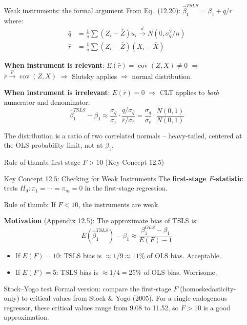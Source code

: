 \documentclass[10pt]{beamer}
\begin{document}
\begin{frame}{Weak instruments: the formal argument}
\label{slide:weak_formal}
From Eq.\ (12.20): $\widehat{\beta}_1^{TSLS} = \beta_1 + \bar{q}/\bar{r}$ where:
\begin{align*}
\bar{q} &= \frac{1}{n}\sum (Z_i - \bar{Z})u_i \xrightarrow{d} N(0, \sigma_q^2/n) \\
\bar{r} &= \frac{1}{n}\sum (Z_i - \bar{Z})(X_i - \bar{X})
\end{align*}

\pause
\textbf{When instrument is relevant}: $E(\bar{r}) = \operatorname{cov}(Z,X) \neq 0$ $\Rightarrow$ $\bar{r} \xrightarrow{p} \operatorname{cov}(Z,X)$ $\Rightarrow$ Slutsky applies $\Rightarrow$ normal distribution.

\pause
\textbf{When instrument is irrelevant}: $E(\bar{r}) = 0$ $\Rightarrow$ CLT applies to \emph{both} numerator and denominator:
\[
\widehat{\beta}_1^{TSLS} - \beta_1 \approx \frac{\sigma_q}{\sigma_r}\cdot\frac{\bar{q}/\sigma_{\bar{q}}}{\bar{r}/\sigma_{\bar{r}}} = \frac{\sigma_q}{\sigma_r}\cdot\frac{N(0,1)}{N(0,1)}
\]

The distribution is a \alert{ratio of two correlated normals} -- heavy-tailed, centered at the OLS probability limit, not at $\beta_1$.
\end{frame}

\begin{frame}{Rule of thumb: first-stage $F > 10$ (Key Concept 12.5)}
\label{slide:rule_of_thumb}

\begin{block}{Key Concept 12.5: Checking for Weak Instruments}
The \textbf{first-stage $F$-statistic} tests $H_0: \pi_1 = \cdots = \pi_m = 0$ in the first-stage regression.

\vspace{0.3em}
\alert{Rule of thumb}: If $F < 10$, the instruments are weak.
\end{block}

\pause
\textbf{Motivation} (Appendix 12.5): The approximate bias of TSLS is:
\[
E(\widehat{\beta}_1^{TSLS}) - \beta_1 \approx \frac{\beta_1^{OLS} - \beta_1}{E(F) - 1}
\]
\begin{itemize}
  \item If $E(F) = 10$: TSLS bias is $\approx 1/9 \approx 11\%$ of OLS bias. Acceptable.
  \item If $E(F) = 5$: TSLS bias is $\approx 1/4 = 25\%$ of OLS bias. Worrisome.
\end{itemize}

\pause
\begin{exampleblock}{Stock--Yogo test}
Formal version: compare the first-stage $F$ (homoskedasticity-only) to critical values from Stock \& Yogo (2005). For a single endogenous regressor, these critical values range from 9.08 to 11.52, so $F > 10$ is a good approximation.
\end{exampleblock}
\end{frame}
\end{document}
